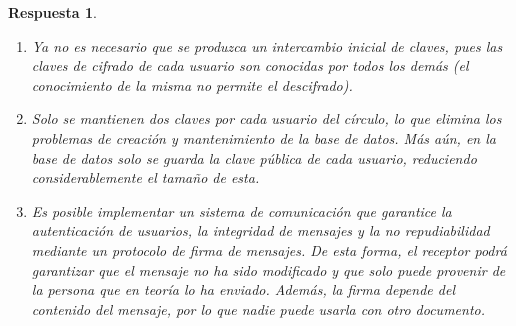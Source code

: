 \documentclass[
  a4paper,
  spanish,
  12pt,
]{scrartcl}
\theoremstyle{ejercicio-style}
\theoremstyle{remark-style}
\newtheorem*{sol}{Respuesta}
\theoremstyle{teorema-style}
\begin{document}
\begin{sol}
\begin{enumerate}
  \item Ya no es necesario que se produzca un intercambio inicial de claves, pues las claves de cifrado de cada usuario son conocidas por todos los demás (el conocimiento de la misma no permite el descifrado).

  \item Solo se mantienen dos claves por cada usuario del círculo, lo que elimina los problemas de creación y mantenimiento de la base de datos. Más aún, en la base de datos solo se guarda la clave pública de cada usuario, reduciendo considerablemente el tamaño de esta.

\item Es posible implementar un sistema de comunicación que garantice la \textit{autenticación} de usuarios, la \textit{integridad} de mensajes y la \textit{no repudiabilidad} mediante un protocolo de firma de mensajes. De esta forma, el receptor podrá garantizar que el mensaje no ha sido modificado y que solo puede provenir de la persona que en teoría lo ha enviado. Además, la firma depende del contenido del mensaje, por lo que nadie puede usarla con otro documento.

\end{enumerate}
\end{sol}
\end{document}
